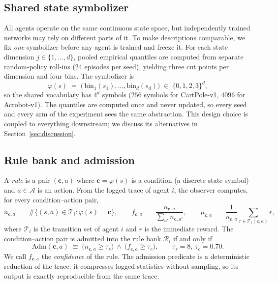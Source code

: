 \documentclass[11pt]{article}
\begin{document}
\subsection{Shared state symbolizer}
\label{sec:method:symbolizer}

All agents operate on the same continuous state space, but independently trained networks may rely
on different parts of it. To make descriptions comparable, we fix \emph{one} symbolizer before any
agent is trained and freeze it. For each state dimension $j\in\{1,\ldots,d\}$, pooled empirical
quantiles are computed from separate random-policy roll-ins (24 episodes per seed), yielding three
cut points per dimension and four bins. The symbolizer is
\begin{equation}
\varphi(s) \;=\; \big(\,\mathrm{bin}_1(s_1),\ldots,\mathrm{bin}_d(s_d)\big)\;\in\;\{0,1,2,3\}^{d},
\label{eq:symbolizer}
\end{equation}
so the shared vocabulary has $4^{d}$ symbols ($256$ symbols for CartPole-v1, $4096$ for
Acrobot-v1). The quantiles are computed once and never updated, so every seed and every arm of the
experiment sees the same abstraction. This design choice is coupled to everything downstream; we
discuss its alternatives in Section~\ref{sec:discussion}.

\subsection{Rule bank and admission}
\label{sec:method:rules}

A \emph{rule} is a pair $(\mathbf{c},a)$ where $\mathbf{c}=\varphi(s)$ is a condition (a discrete
state symbol) and $a\in\mathcal{A}$ is an action. From the logged trace of agent $i$, the observer
computes, for every condition--action pair,
\begin{equation}
n_{\mathbf{c},a} \;=\; \#\{(s,a)\in \mathcal{T}_i : \varphi(s)=\mathbf{c}\},
\qquad
f_{\mathbf{c},a} \;=\; \frac{n_{\mathbf{c},a}}{\sum_{a'} n_{\mathbf{c},a'}},
\qquad
\mu_{\mathbf{c},a} \;=\; \frac{1}{n_{\mathbf{c},a}}\sum_{r\in \mathcal{T}_i(\mathbf{c},a)} r,
\label{eq:rulestats}
\end{equation}
where $\mathcal{T}_i$ is the transition set of agent $i$ and $r$ is the immediate reward. The
condition--action pair is admitted into the rule bank $\mathcal{R}_i$ if and only if
\begin{equation}
\mathrm{Adm}(\mathbf{c},a)\;\equiv\;\big(n_{\mathbf{c},a}\ge \tau_{s}\big)\ \wedge\ \big(f_{\mathbf{c},a}\ge \tau_{c}\big),
\qquad \tau_{s}=8,\ \tau_{c}=0.70 .
\label{eq:admission}
\end{equation}
We call $f_{\mathbf{c},a}$ the \emph{confidence} of the rule. The admission predicate is a
deterministic reduction of the trace: it compresses logged statistics without sampling, so its
output is exactly reproducible from the same trace.
\end{document}
